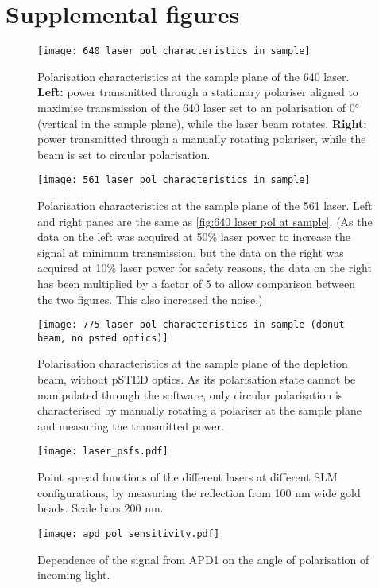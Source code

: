 \section{Supplemental figures}

\begin{figure}[h]
	\centering
	\texttt{[image: 640 laser pol characteristics in sample]}
	\caption{
		Polarisation characteristics at the sample plane of the 640 laser. \textbf{Left:} power transmitted through a stationary polariser aligned to maximise transmission of the 640 laser set to an polarisation of 0° (vertical in the sample plane), while the laser beam rotates. \textbf{Right:} power transmitted through a manually rotating polariser, while the beam is set to circular polarisation.
	}
	\label{fig:640 laser pol at sample}
\end{figure}

\begin{figure}[h]
	\centering
	\texttt{[image: 561 laser pol characteristics in sample]}
	\caption{
		Polarisation characteristics at the sample plane of the 561 laser. Left and right panes are the same as \autoref{fig:640 laser pol at sample}. (As the data on the left was acquired at 50\% laser power to increase the signal at minimum transmission, but the data on the right was acquired at 10\% laser power for safety reasons, the data on the right has been multiplied by a factor of 5 to allow comparison between the two figures. This also increased the noise.)
	}
	\label{fig:561 laser pol at sample}
\end{figure}

\begin{figure}[h]
	\centering
	\texttt{[image: 775 laser pol characteristics in sample (donut beam, no psted optics)]}
	\caption{
		Polarisation characteristics at the sample plane of the depletion beam, without pSTED optics. As its polarisation state cannot be manipulated through the software, only circular polarisation is characterised by manually rotating a polariser at the sample plane and measuring the transmitted power.
	}
	\label{fig:775 laser pol at sample}
\end{figure}

\begin{figure}[h]
	\centering
	\texttt{[image: laser\_psfs.pdf]}
	\caption{
		Point spread functions of the different lasers at different SLM configurations, by measuring the reflection from 100 nm wide gold beads. Scale bars 200 nm. 
	}
	\label{fig:normal psfs}
\end{figure}

\begin{figure}[h]
	\centering
	\texttt{[image: apd\_pol\_sensitivity.pdf]}
	\caption{Dependence of the signal from APD1 on the angle of polarisation of incoming light.}
	\label{fig:apd pol sensitivity}
\end{figure}